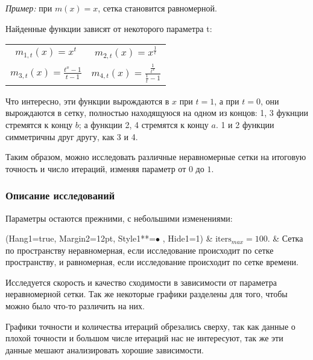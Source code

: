 \textit{Пример:} при $m(x) = x$, сетка становится равномерной.

Найденные функции зависят от некоторого параметра t:

\begin{center}\begin{tabular}{cc}
$ m_{1, t}(x) = x^t $ & $ m_{2, t}(x) = x^\frac{1}{t} $ \\
$ m_{3, t}(x) = \frac{t^x-1}{t-1} $ & $ m_{4, t}(x) = \frac{\frac{1}{t^x}}{\frac{1}{t}-1} $
\end{tabular}\end{center}

Что интересно, эти функции вырождаются в $x$ при $t=1$, а при $t=0$, они вырождаются в сетку, полностью находящуюся на одном из концов: 1, 3 фукнции стремятся к концу $b$; а функции 2, 4 стремятся к концу $a$. 1 и 2 функции симметричны друг другу, как 3 и 4.

Таким образом, можно исследовать различные неравномерные сетки на итоговую точность и число итераций, изменяя параметр от $0$ до $1$.

\subsubsection{Описание исследований}

Параметры остаются прежними, с небольшими изменениями:

\begin{easylist}
\ListProperties(Hang1=true, Margin2=12pt, Style1**=$\bullet$ , Hide1=1)
& $\mathrm{iters}_{max} = 100$.
& Сетка по пространству неравномерная, если исследование происходит по сетке пространству, и равномерная, если исследование происходит по сетке времени.
\end{easylist}

Исследуется скорость и качество сходимости в зависимости от параметра неравномерной сетки. Так же некоторые графики разделены для того, чтобы можно было что-то различить на них.

Графики точности и количества итераций обрезались сверху, так как данные о плохой точности и большом числе итераций нас не интересуют, так же эти данные мешают анализировать хорошие зависимости.

